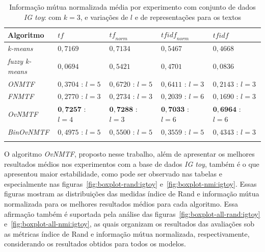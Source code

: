 \documentclass[
    12pt,                %
    oneside,            %
    a4paper,            %
    english,            %
    brazil                %
    ]{abntex2ppgsi}
\begin{document}
\begin{table}[H]
\centering
    \caption{Informação mútua normalizada média por experimento com conjunto de dados \textit{IG toy}: com $k = 3$, e variações de $l$ e de representações para os textos}
    \begin{tabular}{lllll}
        \hline
        \textbf{Algoritmo}              & $\textit{tf}$ & $\textit{tf}_{norm}$ & $\textit{tfidf}_{norm}$ & $\textit{tfidf}$ \\
        \hline
        \textit{k-means}       & $0,7169$                    & $0,7134$                    & $0,5467$           & $0,4668$           \\
        \textit{fuzzy k-means} & $0,0694$                    & $0,5421$                    & $0,4701$           & $0,0836$           \\
        \textit{ONMTF}         & $0,3704$ : $l = 5$          & $0,6720$ : $l = 5$          & $0,6411$ : $l = 3$ & $0,2143$ : $l = 3$ \\
        \textit{FNMTF}         & $0,2770$ : $l = 3$          & $0,2734$ : $l = 3$          & $0,2039$ : $l = 6$ & $0,1690$ : $l = 3$ \\
        \textit{OvNMTF}        & $\mathbf{0,7257}$ : $l = 4$ & $\mathbf{0,7288}$ : $l = 3$ & $\mathbf{0,7033}$ : $l = 6$ & $\mathbf{0,6964}$ : $l = 6$ \\
        \textit{BinOvNMTF}     & $0,4975$ : $l = 5$          & $0,5500$ : $l = 5$          & $0,3559$ : $l = 5$ & $0,4343$ : $l = 3$ \\
        \hline \\
    \end{tabular}
    \label{tab:experiments-quant-nmi:igtoy}
\end{table}

O algoritmo \textit{OvNMTF}, proposto nesse trabalho, além de apresentar os melhores resultados médios nos experimentos com a base de dados \textit{IG toy}, também é o que apresentou maior estabilidade, como pode ser observado nas tabelas e especialmente nas figuras~\ref{fig:boxplot-rand:igtoy} e~\ref{fig:boxplot-nmi:igtoy}. Essas figuras mostram as distribuições das medidas índice de Rand e informação mútua normalizada para os melhores resultados médios para cada algoritmo. Essa afirmação também é suportada pela análise das figuras~\ref{fig:boxplot-all-rand:igtoy} e~\ref{fig:boxplot-all-nmi:igtoy}, as quais organizam os resultados das avaliações sob as métricas índice de Rand e informação mútua normalizada, respectivamente, considerando os resultados obtidos para todos os modelos.
\end{document}
